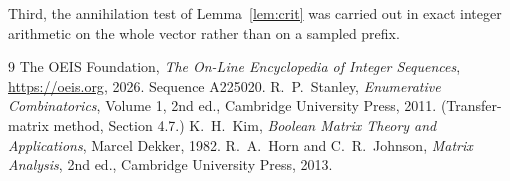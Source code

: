 \documentclass[11pt,a4paper]{article}
\theoremstyle{plain}
\theoremstyle{definition}
\begin{document}
Third, the annihilation test of Lemma~\ref{lem:crit} was carried out in exact integer
arithmetic on the whole vector rather than on a sampled prefix.

\begin{thebibliography}{9}
 The OEIS Foundation, \emph{The On-Line Encyclopedia of Integer
Sequences}, \url{https://oeis.org}, 2026. Sequence A225020.
 R.~P.~Stanley, \emph{Enumerative Combinatorics}, Volume 1, 2nd ed.,
Cambridge University Press, 2011. (Transfer-matrix method, Section 4.7.)
 K.~H.~Kim, \emph{Boolean Matrix Theory and Applications}, Marcel Dekker,
1982.
 R.~A.~Horn and C.~R.~Johnson, \emph{Matrix Analysis}, 2nd ed., Cambridge
University Press, 2013.
\end{thebibliography}
\end{document}
